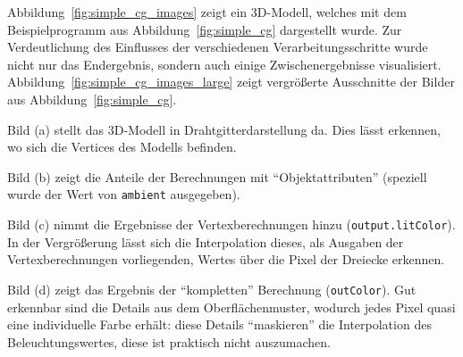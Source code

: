 \documentclass[twoside,a4paper,fleqn,12pt]{book}
\begin{document}
Abbildung~\ref{fig:simple_cg_images} zeigt ein 3D-Modell, welches mit dem Beispielprogramm aus Abbildung~\ref{fig:simple_cg} dargestellt wurde.
Zur Verdeutlichung des Einflusses der verschiedenen Verarbeitungsschritte wurde nicht nur das Endergebnis, sondern auch einige Zwischenergebnisse
visualisiert. Abbildung~\ref{fig:simple_cg_images_large} zeigt vergrößerte Ausschnitte der Bilder aus Abbildung~\ref{fig:simple_cg}.

Bild (a) stellt das 3D-Modell in Drahtgitterdarstellung da. Dies lässt erkennen, wo sich die Vertices des Modells befinden.

Bild (b) zeigt die Anteile der Berechnungen mit  "`Objektattributen"' (speziell wurde der Wert von \verb+ambient+ ausgegeben).

Bild (c) nimmt die Ergebnisse der Vertexberechnungen hinzu (\verb+output.litColor+). In der Vergrößerung lässt sich die Interpolation
dieses, als Ausgaben der Vertexberechnungen vorliegenden, Wertes über die Pixel der Dreiecke erkennen.

Bild (d) zeigt das Ergebnis der "`kompletten"' Berechnung (\verb+outColor+). Gut erkennbar sind die Details aus dem Oberflächenmuster,
wodurch jedes Pixel quasi eine individuelle Farbe erhält: diese Details "`maskieren"' die Interpolation des Beleuchtungswertes, diese ist
praktisch nicht auszumachen.
\end{document}
